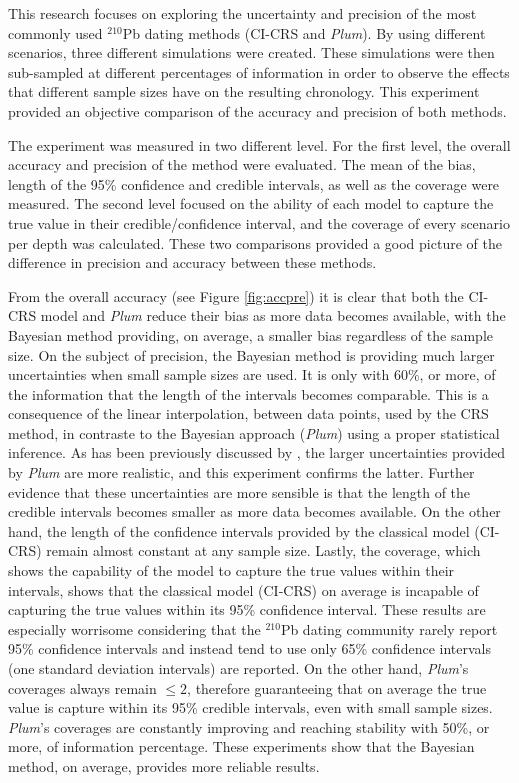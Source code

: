\documentclass [10pt] {article}
\begin{document}
This research focuses on exploring the uncertainty and precision of the most commonly used $^{210}$Pb dating methods (CI-CRS and \textit{Plum}).
By using different scenarios, three different simulations were created.
These simulations were then sub-sampled at different percentages of information in order to observe the effects that different sample sizes have on the resulting chronology. 
This experiment provided an objective comparison of the accuracy and precision of both methods.

The experiment was measured in two different level.
For the first level, the overall accuracy and precision of the method were evaluated.
The mean of the bias, length of the 95\% confidence and credible intervals, as well as the coverage were measured.
The second level focused on the ability of each model to capture the true value in their credible/confidence interval, and the coverage of every scenario per depth was calculated. 
These two comparisons provided a good picture of the difference in precision and accuracy between these methods.

From the overall accuracy (see Figure \ref{fig:accpre}) it is clear that both the CI-CRS model and \textit{Plum} reduce their bias as more data becomes available, with the Bayesian method providing, on average, a smaller bias regardless of the sample size. 
On the subject of precision, the Bayesian method is providing much larger uncertainties when small sample sizes are used. 
It is only with 60\%, or more, of the information that the length of the intervals becomes comparable. 
This is a consequence of the linear interpolation, between data points, used by the CRS method, in contraste to the Bayesian approach (\textit{Plum}) using a proper statistical inference.  
As has been previously discussed by \citet{Aquino2020}, the larger uncertainties provided by \textit{Plum} are more realistic, and this experiment confirms the latter.
Further evidence that these uncertainties are more sensible is that the length of the credible intervals becomes smaller as more data becomes available. 
On the other hand, the length of the confidence intervals provided by the classical model (CI-CRS) remain almost constant at any sample size.
Lastly, the coverage, which shows the capability of the model to capture the true values within their intervals, shows that the classical model (CI-CRS) on average is incapable of capturing the true values within its 95\% confidence interval. 
These results are especially worrisome considering that the $^{210}$Pb dating community rarely report 95\% confidence intervals and instead tend to use only 65\% confidence intervals (one standard deviation intervals) are reported.
On the other hand, \textit{Plum}'s coverages always remain $\leq 2$, therefore guaranteeing that on average the true value is capture within its 95\% credible intervals, even with small sample sizes.
\textit{Plum}'s coverages are constantly improving and reaching stability with 50\%, or more, of information percentage.
These experiments show that the Bayesian method, on average, provides more reliable results.
\end{document}
